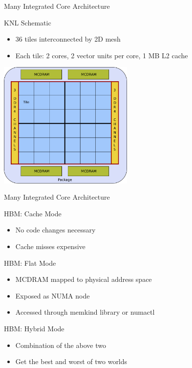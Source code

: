\begin{frame}{Many Integrated Core Architecture}
 
 \begin{block}{KNL Schematic}
  \begin{itemize}
   \item 36 tiles interconnected by 2D mesh
   \item Each tile: 2 cores, 2 vector units per core, 1 MB L2 cache
  \end{itemize}
 \end{block}
 
 \begin{center}
  \includegraphics[width=0.5\textwidth]{figures/knl-schematic} \\
 \end{center}
\end{frame}

\begin{frame}{Many Integrated Core Architecture}
 
 \begin{block}{HBM: Cache Mode}
  \begin{itemize}
   \item No code changes necessary
   \item Cache misses expensive
  \end{itemize}
 \end{block}

 \begin{block}{HBM: Flat Mode}
  \begin{itemize}
   \item MCDRAM mapped to physical address space
   \item Exposed as NUMA node
   \item Accessed through memkind library or numactl
  \end{itemize}
 \end{block}

 \begin{block}{HBM: Hybrid Mode}
  \begin{itemize}
   \item Combination of the above two
   \item Get the best and worst of two worlds
  \end{itemize}
 \end{block}

\end{frame}

